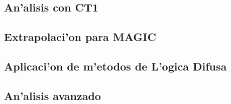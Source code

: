 \subsection{An'alisis con CT1}

\subsection{Extrapolaci'on para MAGIC}

\subsection{Aplicaci'on de m'etodos de L'ogica Difusa}

\subsection{An'alisis avanzado}

\endinput
%

